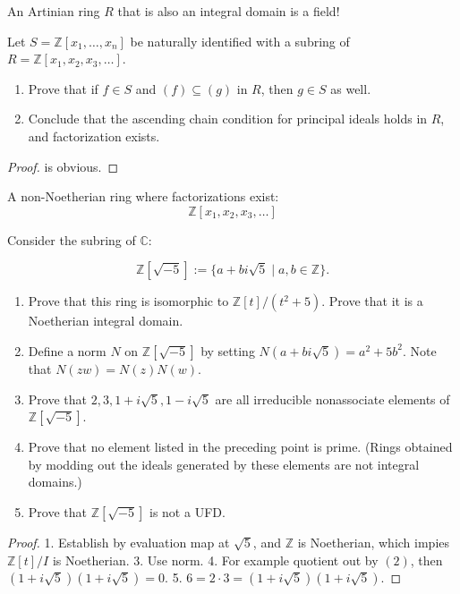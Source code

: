 \documentclass[openany]{book}
\newcommand{\Z}{\mathbb{Z}}
\begin{document}
\begin{prop}
    An Artinian ring $R$ that is also an integral domain is a field!
\end{prop}




\begin{prob}[1.15]
    Let \( S = \mathbb{Z}[x_1, \ldots, x_n] \) be naturally identified with a subring of \( R = \mathbb{Z}[x_1, x_2, x_3, \ldots] \). 
\begin{enumerate}
    \item Prove that if \( f \in S \) and \( (f) \subseteq (g) \) in \( R \), then \( g \in S \) as well.
    \item Conclude that the ascending chain condition for principal ideals holds in \( R \), and factorization exists.
\end{enumerate}
\end{prob}
\begin{proof}
    is obvious.
\end{proof}
\begin{prop}
    A non-Noetherian ring where factorizations exist:
    \begin{equation*}
        \Z[x_1,x_2,x_3,\dots]
    \end{equation*}
\end{prop}


\begin{prob}[1.17]
    Consider the subring of \( \mathbb{C} \):

\[
\mathbb{Z}[\sqrt{-5}] := \{a + bi\sqrt{5} \mid a, b \in \mathbb{Z}\}.
\]

\begin{enumerate}
    \item Prove that this ring is isomorphic to \( \mathbb{Z}[t]/(t^2 + 5) \). Prove that it is a Noetherian integral domain.
    \item Define a norm \( N \) on \( \mathbb{Z}[\sqrt{-5}] \) by setting \( N(a + bi\sqrt{5}) = a^2 + 5b^2 \). Note that $N(zw) = N(z)N(w)$.
    \item Prove that \( 2, 3, 1 + i\sqrt{5}, 1 - i\sqrt{5} \) are all irreducible nonassociate elements of \( \mathbb{Z}[\sqrt{-5}] \).
    \item Prove that no element listed in the preceding point is prime. (Rings obtained by modding out the ideals generated by these elements are not integral domains.)
    \item Prove that \( \mathbb{Z}[\sqrt{-5}] \) is not a UFD.
\end{enumerate}
\end{prob}
\begin{proof}
    1. Establish by evaluation map at $\sqrt{5}$, and $\Z$ is Noetherian, which impies $\Z[t]/I$ is Noetherian. 3. Use norm. 4. For example quotient out by $(2)$, then $(1+i\sqrt{5})(1+i\sqrt{5})=0$. 5. $6=2\cdot 3=(1+i\sqrt{5})(1+i\sqrt{5})$.
\end{proof}
\end{document}
